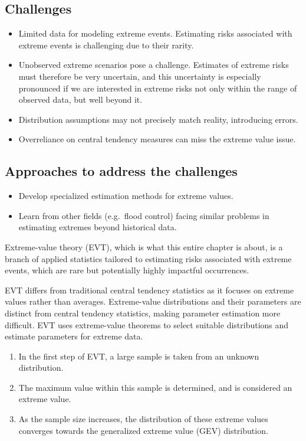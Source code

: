 \subsection{Challenges}
\begin{itemize}
\item Limited data for modeling extreme events. Estimating risks associated with extreme events
      is challenging due to their rarity.
\item Unobserved extreme scenarios pose a challenge. Estimates of extreme risks must therefore
      be very uncertain, and this uncertainty is especially pronounced if we are interested in
      extreme risks not only within the range of observed data, but well beyond it.
\item Distribution assumptions may not precisely match reality, introducing errors.
\item Overreliance on central tendency measures can miss the extreme value issue.
\end{itemize}

\subsection{Approaches to address the challenges}
\begin{itemize}
\item Develop specialized estimation methods for extreme values.
\item Learn from other fields (e.g.\ flood control) facing similar problems in estimating
      extremes beyond historical data.
\end{itemize}


Extreme-value theory (EVT), which is what this entire chapter is about, is a branch of applied
statistics tailored to estimating risks associated with extreme events, which are rare but
potentially highly impactful occurrences.

EVT differs from traditional central tendency statistics as it focuses on extreme values rather
than averages. Extreme-value distributions and their parameters are distinct from central
tendency statistics, making parameter estimation more difficult. EVT uses extreme-value theorems
to select suitable distributions and estimate parameters for extreme data.

\begin{mrkeybox}[title={The EVT process}]
\begin{enumerate}[label=\textbf{\alph*.}]
\item In the first step of EVT, a large sample is taken from an unknown distribution.
\item The maximum value within this sample is determined, and is considered an extreme value.
\item As the sample size increases, the distribution of these extreme values converges towards
      the generalized extreme value (GEV) distribution.
\end{enumerate}
\end{mrkeybox}

